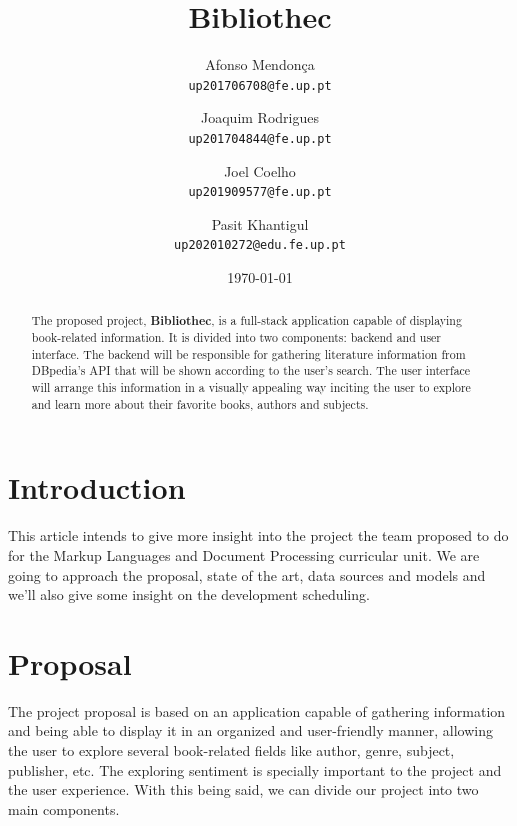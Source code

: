 \documentclass[twocolumn,twoside,11pt,a4paper]{article}
\title{\vspace{-15mm}\fontsize{24pt}{10pt}\selectfont\textbf{Bibliothec}} %
\author{Afonso Mendonça\\
\small \texttt{up201706708@fe.up.pt}\\
\and
Joaquim Rodrigues\\
\small \texttt{up201704844@fe.up.pt}
\vspace{-5mm}
\and
Joel Coelho\\
\small \texttt{up201909577@fe.up.pt}
\vspace{-5mm}
\and
Pasit Khantigul\\
\small \texttt{up202010272@edu.fe.up.pt}
\vspace{-5mm}
}
\date{
    \vspace{10mm}
    \today
}
\begin{document}
\maketitle
\thispagestyle{plain}            %


\begin{abstract}

The proposed project, \textbf{Bibliothec}, is a full-stack application capable of displaying book-related information. It is divided into two components: backend and user interface. The backend will be responsible for gathering literature information from DBpedia’s API that will be shown according to the user’s search. The user interface will arrange this information in a visually appealing way inciting the user to explore and learn more about their favorite books, authors and subjects. 

\end{abstract}


\section{Introduction}\label{sec:intro}

This article intends to give more insight into the project the team proposed to do for the Markup Languages and Document Processing curricular unit. We are going to approach the proposal, state of the art, data sources and models and we’ll also give some insight on the development scheduling.


\section{Proposal}\label{sec:proposal}

The project proposal is based on an application capable of gathering information and being able to display it in an organized and user-friendly manner, allowing the user to explore several book-related fields like author, genre, subject, publisher, etc. The exploring sentiment is specially important to the project and the user experience. With this being said, we can divide our project into two main components.
\end{document}
